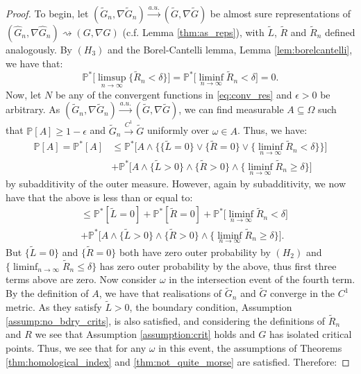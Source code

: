 \documentclass[11pt]{article}
\newcommand{\1}{\mathbf{1}}
\theoremstyle{definition}
\theoremstyle{remark}
\begin{document}
\begin{proof}
    To begin, let $(\tilde{G}_n, \nabla \tilde{G}_n)\xrightarrow{a.u.} (\tilde{G}, \nabla \tilde{G})$ be almost sure representations of $(\hat{G}_n, \nabla \hat{G}_n)\rightsquigarrow (G, \nabla G)$ (c.f. Lemma \ref{thm:as_reps}), with $\tilde{L}$, $\tilde{R}$ and $\tilde{R}_n$ defined analogously. By $(H_3)$ and the Borel-Cantelli lemma, Lemma \ref{lem:borelcantelli}, we have that:
    \begin{equation}\nonumber
        \mathbb{P}^*\bigg[\limsup_{n\rightarrow\infty}\{\tilde{R}_n<\delta\}\bigg] = \mathbb{P}^*\bigg[\liminf_{n\rightarrow\infty}\tilde{R}_n<\delta \bigg] = 0.
    \end{equation}
    Now, let $N$ be any of the convergent functions in \eqref{eq:conv_res} and $\epsilon > 0$ be arbitrary. As $(\tilde{G}_n, \nabla \tilde{G}_n)\xrightarrow{a.u.} (\tilde{G}, \nabla \tilde{G})$, we can find measurable $A\subseteq \Omega$ such that $\mathbb{P}[A]\geq 1-\epsilon$ and $\tilde{G}_n\xrightarrow{C^1} \tilde{G}$  uniformly over $\omega \in A$. Thus, we have:
    \begin{equation}\nonumber
        \begin{split}
            \mathbb{P}[A]=\mathbb{P}^{*}[A] & \leq \mathbb{P}^{*}\bigg[A \land \bigg\{\big\{\tilde{L}=0\big\} \lor \big\{\tilde{R}=0\big\} \lor \big\{\liminf_{n\rightarrow\infty}\tilde{R}_n < \delta \big\}\bigg\}\bigg] \\
            &  + \mathbb{P}^{*}\bigg[A \land \big\{\tilde{L}>0\big\} \land \big\{\tilde{R}>0\big\} \land \big\{\liminf_{n\rightarrow\infty}\tilde{R}_n \geq \delta \big\}\bigg]
        \end{split}
    \end{equation}
    by subadditivity of the outer measure. However, again by subadditivity, we now have that the above is less than or equal to:
    \begin{equation}\nonumber
        \begin{split}
            & \leq \mathbb{P}^{*}[\tilde{L}=0] +\mathbb{P}^{*}[\tilde{R}=0] + \mathbb{P}^{*}\bigg[\liminf_{n\rightarrow\infty}\tilde{R}_n < \delta \bigg] \\
            &  + \mathbb{P}^{*}\bigg[A \land \big\{\tilde{L}>0\big\} \land \big\{\tilde{R}>0\big\} \land \big\{\liminf_{n\rightarrow\infty}\tilde{R}_n \geq \delta \big\}\bigg].
        \end{split}
    \end{equation}
    But $\{\tilde{L}=0\}$ and $\{\tilde{R}=0\}$ both have zero outer probability by $(H_2)$ and $\{\liminf_{n\rightarrow\infty}\tilde{R}_n \leq \delta \}$ has zero outer probability by the above, thus first three terms above are zero. Now consider $\omega$ in the intersection event of the fourth term. By the definition of $A$, we have that realisations of $\tilde{G}_n$ and $\tilde{G}$ converge in the $C^1$ metric. As they satisfy $\tilde{L}>0$, the boundary condition, Assumption  \ref{assump:no_bdry_crits}, is also satisfied, and considering the definitions of $\tilde{R}_n$ and $R$ we see that Assumption \ref{assumption:crit} holds and $G$ has isolated critical points. Thus, we see that for any $\omega$ in this event, the assumptions of Theorems \ref{thm:homological_index} and \ref{thm:not_quite_morse} are satisfied. Therefore:

\end{proof}
\end{document}
